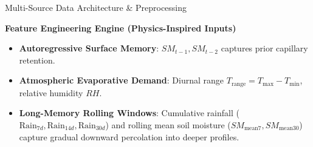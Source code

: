 \documentclass[aspectratio=169, 10pt]{beamer}
\begin{document}
\begin{frame}{Multi-Source Data Architecture \& Preprocessing}
    \vspace{0.25cm}
    \begin{exampleblock}{\textbf{Feature Engineering Engine (Physics-Inspired Inputs)}}
        \footnotesize
        \begin{itemize}
            \item \textbf{Autoregressive Surface Memory}: $SM_{t-1}, SM_{t-2}$ captures prior capillary retention.
            \item \textbf{Atmospheric Evaporative Demand}: Diurnal range $T_{\text{range}} = T_{\max} - T_{\min}$, relative humidity $RH$.
            \item \textbf{Long-Memory Rolling Windows}: Cumulative rainfall ($\text{Rain}_{7d}, \text{Rain}_{14d}, \text{Rain}_{30d}$) and rolling mean soil moisture ($SM_{\text{mean}7}, SM_{\text{mean}30}$) capture gradual downward percolation into deeper profiles.
        \end{itemize}
    \end{exampleblock}
\end{frame}
\end{document}
